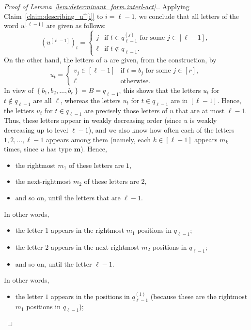 \documentclass[reqno]{amsart}
\newcommand{\0}{\phantom{c}}
\newcommand{\mm}{\mathbf{m}}
\newcommand{\set}[1]{\left\{ #1 \right\}}
\newcommand{\ive}[1]{\left[ #1 \right]}
\theoremstyle{plain}
\theoremstyle{definition}
\numberwithin{equation}{section}
\begin{document}
\begin{proof}[Proof of Lemma~\ref{lem:determinant_form.interl-act}.]
Applying Claim~\ref{claim:describing_u^[i]} to $i=\ell-1$, we conclude that
all letters of the word $u^{\left[  \ell-1\right]}$ are given as follows:
\begin{equation}
\label{pf.lem:determinant_form.interl-act.fwd.5}
\left( u^{\left[  \ell-1\right]} \right)_t =
\begin{cases}
j & \text{if } t \in q_{\ell-1}^{(j)} \text{ for some } j \in\ive{\ell-1}\!, \\
\ell & \text{if } t \notin q_{\ell-1}.
\end{cases}
\end{equation}
On the other hand, the letters of $u$ are given, from the construction, by
\[
u_t =
\begin{cases}
v_j \in \ive{\ell-1} & \text{if } t = b_j \text{ for some } j \in \ive{r}\!, \\
\ell & \text{otherwise.}
\end{cases}
\]
In view of $\set{b_1, b_2, \ldots, b_r} = B = q_{\ell-1}$, this shows that the letters $u_t$ for $t \notin q_{\ell-1}$ are all $\ell$, whereas the letters $u_t$ for $t \in q_{\ell-1}$ are in $\ive{\ell-1}$.
Hence, the letters $u_t$ for $t \in q_{\ell-1}$ are precisely those letters of $u$ that are at most $\ell-1$.
Thus, these letters appear in weakly decreasing order (since $u$ is weakly decreasing up to level $\ell-1$), and we also know how often each of the letters $1, 2, \ldots, \ell-1$ appears among them (namely, each $k \in \ive{\ell-1}$ appears $m_k$ times, since $u$ has type $\mm$).
Hence,
\begin{itemize}
\item the rightmost $m_1$ of these letters are $1$,
\item the next-rightmost $m_2$ of these letters are $2$,
\item and so on, until the letters that are $\ell-1$.
\end{itemize}
In other words,
\begin{itemize}
\item the letter $1$ appears in the rightmost $m_1$ positions in $q_{\ell-1}$;
\item the letter $2$ appears in the next-rightmost $m_2$ positions in $q_{\ell-1}$;
\item and so on, until the letter $\ell-1$.
\end{itemize}
In other words,
\begin{itemize}
\item the letter $1$ appears in the positions in $q_{\ell-1}^{(1)}$ (because these are the rightmost $m_1$ positions in $q_{\ell-1}$);

\end{itemize}
\end{proof}
\end{document}
